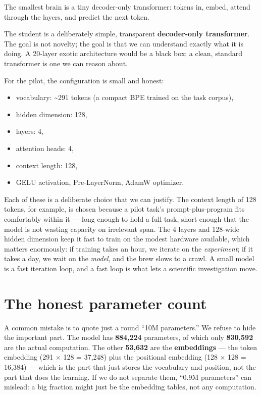 The smallest brain is a tiny decoder-only transformer: tokens in, embed,
attend through the layers, and predict the next token.

The student is a deliberately simple, transparent \textbf{decoder-only
transformer}. The goal is not novelty; the goal is that we can
understand exactly what it is doing. A 20-layer exotic architecture
would be a black box; a clean, standard transformer is one we can reason
about.

For the pilot, the configuration is small and honest:

\begin{itemize}
\tightlist
\item
  vocabulary: \textasciitilde291 tokens (a compact BPE trained on the
  task corpus),
\item
  hidden dimension: 128,
\item
  layers: 4,
\item
  attention heads: 4,
\item
  context length: 128,
\item
  GELU activation, Pre-LayerNorm, AdamW optimizer.
\end{itemize}

Each of these is a deliberate choice that we can justify. The context
length of 128 tokens, for example, is chosen because a pilot task's
prompt-plus-program fits comfortably within it --- long enough to hold a
full task, short enough that the model is not wasting capacity on
irrelevant span. The 4 layers and 128-wide hidden dimension keep it fast
to train on the modest hardware available, which matters enormously: if
training takes an hour, we iterate on the \emph{experiment}; if it takes
a day, we wait on the \emph{model}, and the brew slows to a crawl. A
small model is a fast iteration loop, and a fast loop is what lets a
scientific investigation move.

\section{The honest parameter count}\label{the-honest-parameter-count}

A common mistake is to quote just a round ``10M parameters.'' We refuse
to hide the important part. The model has \textbf{884,224} parameters,
of which only \textbf{830,592} are the actual computation. The other
\textbf{53,632} are the \textbf{embeddings} --- the token embedding (291
× 128 = 37,248) plus the positional embedding (128 × 128 = 16,384) ---
which is the part that just stores the vocabulary and position, not the
part that does the learning. If we do not separate them, ``0.9M
parameters'' can mislead: a big fraction might just be the embedding
tables, not any computation.

